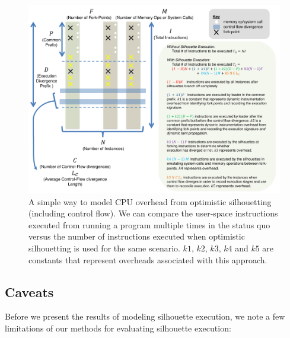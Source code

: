 \begin{figure}
  \centering
  \includegraphics[scale=0.75, trim=3cm 0cm 1cm 0cm]{calc3.pdf}
  \caption[Modeling CPU overhead from optimistic silhouetting (excluding control flow)]%
          {A simple way to model CPU overhead from optimistic silhouetting (including control flow).
            We can compare the user-space instructions executed from running
            a program multiple times in the status quo
            versus the number of instructions executed
            when optimistic silhouetting is used for
            the same scenario. $k1$, $k2$, $k3$, $k4$ and $k5$ 
            are constants that represent overheads
            associated with this approach.}
  \label{oscoverhead}
\end{figure}

\subsection{Caveats}
Before we present the results of modeling
silhouette execution, we note a
few limitations of our
methods for evaluating 
silhouette execution:

